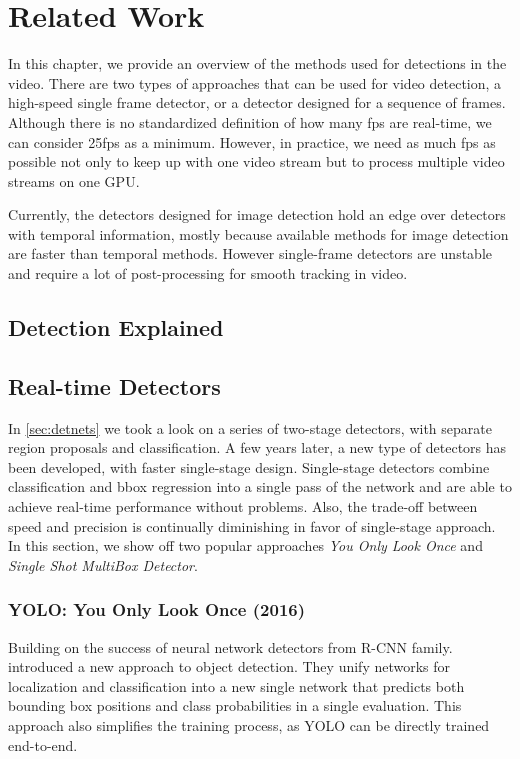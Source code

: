 \chapter{Related Work}
\label{chap:related}

In this chapter, we provide an overview of the methods used for detections in the video. There are two types of approaches that can be used for video detection, a high-speed single frame detector, or a detector designed for a sequence of frames. Although there is no standardized definition of how many fps are real-time, we can consider 25fps as a minimum. However, in practice, we need as much fps as possible not only to keep up with one video stream but to process multiple video streams on one GPU. 

Currently, the detectors designed for image detection hold an edge over detectors with temporal information, mostly because available methods for image detection are faster than temporal methods. However single-frame detectors are unstable and require a lot of post-processing for smooth tracking in video. 

\section{Detection Explained}

\section{Real-time Detectors}
\label{sec:rltm}
In \cref{sec:detnets} we took a look on a series of two-stage detectors, with separate region proposals and classification. A few years later, a new type of detectors has been developed, with faster single-stage design. Single-stage detectors combine classification and bbox regression into a single pass of the network and are able to achieve real-time performance without problems. Also, the trade-off between speed and precision is continually diminishing in favor of single-stage approach. In this section, we show off two popular approaches \textit{You Only Look Once} and \textit{Single Shot MultiBox Detector}.

\subsection{YOLO: You Only Look Once (2016)}
\label{sec:yolo}
Building on the success of neural network detectors from R-CNN family. \citeauthor{bib:yolo} \cite{bib:yolo} introduced a new approach to object detection. They unify networks for localization and classification into a new single network that predicts both bounding box positions and class probabilities in a single evaluation. This approach also simplifies the training process, as YOLO can be directly trained end-to-end. 


